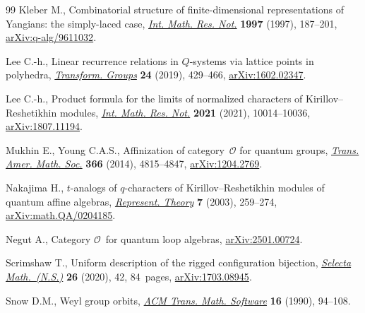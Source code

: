 \documentclass[pdftex]{sigma}
\numberwithin{equation}{section}
\theoremstyle{definition}
\begin{document}
\begin{thebibliography}{99}
Kleber M., Combinatorial structure of finite-dimensional representations of
 {Y}angians: the simply-laced case,
 \href{https://doi.org/10.1155/S1073792897000135}{\textit{Int. Math. Res.
 Not.}} \textbf{1997} (1997), 187--201,
 \href{http://arxiv.org/abs/q-alg/9611032}{arXiv:q-alg/9611032}.

Lee C.-h., Linear recurrence relations in {$Q$}-systems via lattice points in
 polyhedra,
 \href{https://doi.org/10.1007/s00031-018-9502-9}{\textit{Transform. Groups}}
 \textbf{24} (2019), 429--466,
 \href{http://arxiv.org/abs/1602.02347}{arXiv:1602.02347}.

Lee C.-h., Product formula for the limits of normalized characters of
 {K}irillov--{R}eshetikhin modules,
 \href{https://doi.org/10.1093/imrn/rnz113}{\textit{Int. Math. Res. Not.}}
 \textbf{2021} (2021), 10014--10036,
 \href{http://arxiv.org/abs/1807.11194}{arXiv:1807.11194}.

Mukhin E., Young C.A.S., Affinization of category~{$\mathcal{O}$} for quantum
 groups, \href{https://doi.org/10.1090/S0002-9947-2014-06039-X}{\textit{Trans.
 Amer. Math. Soc.}} \textbf{366} (2014), 4815--4847,
 \href{http://arxiv.org/abs/1204.2769}{arXiv:1204.2769}.

Nakajima H., {$t$}-analogs of {$q$}-characters of {K}irillov--{R}eshetikhin
 modules of quantum affine algebras,
 \href{https://doi.org/10.1090/S1088-4165-03-00164-X}{\textit{Represent.
 Theory}} \textbf{7} (2003), 259--274,
 \href{http://arxiv.org/abs/math.QA/0204185}{arXiv:math.QA/0204185}.

Negut A., Category {$\mathcal{O}$}~for quantum loop algebras,
 \href{http://arxiv.org/abs/2501.00724}{arXiv:2501.00724}.

Scrimshaw T., Uniform description of the rigged configuration bijection,
 \href{https://doi.org/10.1007/s00029-020-00564-8}{\textit{Selecta
 Math.~(N.S.)}} \textbf{26} (2020), 42, 84~pages,
 \href{http://arxiv.org/abs/1703.08945}{arXiv:1703.08945}.

Snow D.M., Weyl group orbits,
 \href{https://doi.org/10.1145/77626.77634}{\textit{ACM Trans. Math.
 Software}} \textbf{16} (1990), 94--108.

\end{thebibliography}\LastPageEnding
\end{document}
